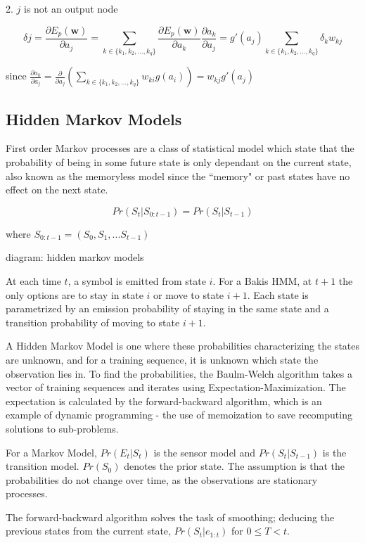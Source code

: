\documentclass[12pt,a4,notitlepage]{report}
\renewcommand{\_}{\texttt{\symbol{95}}}
\newcommand{\<}{\texttt{\symbol{60}}}
\renewcommand{\>}{\texttt{\symbol{62}}}
\begin{document}
2. $j$ is not an output node

\[
\delta j = \frac {\partial E_p (\mathbf w)} {\partial a_j}
 = \sum_{k \in \{k_1, k_2,\ldots,k_q\}} \frac {\partial E_p (\mathbf w)} {\partial a_k} \frac {\partial a_k} {\partial a_j}
 = g'(a_j) \sum_{k \in \{k_1, k_2,\ldots,k_q\}} {\delta_k w_{kj}}
\]

since $ \frac {\partial a_k} {\partial a_j} = \frac {\partial} {\partial a_j} \left( \sum_{k \in \{k_1, k_2,\ldots,k_q\}} { w_{ki} g(a_i) } \right) = w_{kj} g'(a_j) $

\subsection{Hidden Markov Models}

First order Markov processes are a class of statistical model which state that the probability of being in some future state is only dependant on the current state, also known as the memoryless model since the ``memory" or past states have no effect on the next state.

\[ Pr(S_t|S_{0:t-1}) = Pr(S_t|S_{t-1}) \]

where $S_{0:t-1} = (S_0,S_1,...S_{t-1})$


{diagram: hidden markov models}

At each time $t$, a symbol is emitted from state $i$. For a Bakis HMM, at $t+1$ the only options are to stay in state $i$ or move to state $i+1$. Each state is parametrized by an emission probability of staying in the same state and a transition probability of moving to state $i+1$.

A Hidden Markov Model is one where these probabilities characterizing the states are unknown, and for a training sequence, it is unknown which state the observation lies in. To find the probabilities, the Baulm-Welch algorithm takes a vector of training sequences and iterates using Expectation-Maximization. The expectation is calculated by the forward-backward algorithm, which is an example of dynamic programming - the use of memoization to save recomputing solutions to sub-problems.

For a Markov Model, $Pr(E_t|S_t)$ is the sensor model and $Pr(S_t|S_{t-1})$ is the transition model. $Pr(S_0)$ denotes the prior state. The assumption is that the probabilities do not change over time, as the observations are stationary processes.

The forward-backward algorithm solves the task of smoothing; deducing the previous states from the current state, $Pr(S_t|e_{1:t})$ for $0 \leq T < t$. 
\end{document}
